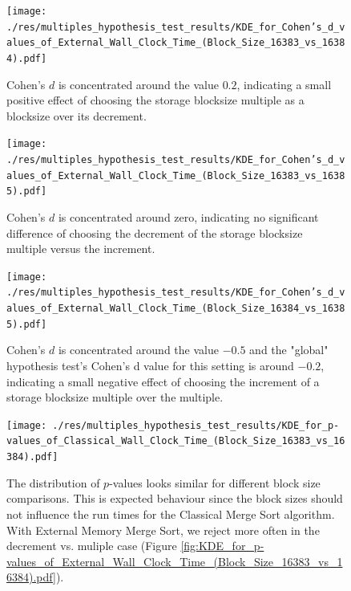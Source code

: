 \documentclass[twocolumn]{article}
\begin{document}
\begin{figure}[htb]
	\begin{minipage}{0.475 \textwidth}
	\centering
	\texttt{[image: ./res/multiples\_hypothesis\_test\_results/KDE\_for\_Cohen's\_d\_values\_of\_External\_Wall\_Clock\_Time\_(Block\_Size\_16383\_vs\_16384).pdf]}
	\caption{Cohen's \(d\) is concentrated around the value \( 0.2 \), indicating a small positive effect of choosing the storage blocksize multiple as a blocksize over its decrement.}
	\label{fig:KDE_for_Cohen's_d_values_of_External_Wall_Clock_Time_(Block_Size_16383_vs_16384).pdf}
	\end{minipage}
\end{figure}

\begin{figure}[htb]
	\begin{minipage}{0.475 \textwidth}
	\centering
	\texttt{[image: ./res/multiples\_hypothesis\_test\_results/KDE\_for\_Cohen's\_d\_values\_of\_External\_Wall\_Clock\_Time\_(Block\_Size\_16383\_vs\_16385).pdf]}
	\caption{Cohen's \(d\) is concentrated around zero, indicating no significant difference of choosing the decrement of the storage blocksize multiple versus the increment.}
	\label{fig:KDE_for_Cohen's_d_values_of_External_Wall_Clock_Time_(Block_Size_16383_vs_16385).pdf}
	\end{minipage}
\end{figure}

\begin{figure}[htb]
	\begin{minipage}{0.475 \textwidth}
	\centering
	\texttt{[image: ./res/multiples\_hypothesis\_test\_results/KDE\_for\_Cohen's\_d\_values\_of\_External\_Wall\_Clock\_Time\_(Block\_Size\_16384\_vs\_16385).pdf]}
	\caption{Cohen's \(d\) is concentrated around the value \( -0.5 \) and the "global" hypothesis test's Cohen's d value for this setting is around \( -0.2 \), 
	indicating a small negative effect of choosing the increment of a storage blocksize multiple over the multiple.}
	\label{fig:KDE_for_Cohen's_d_values_of_External_Wall_Clock_Time_(Block_Size_16384_vs_16385).pdf}
	\end{minipage}
\end{figure}

\begin{figure}[htb]
	\begin{minipage}{0.475 \textwidth}
	\centering
	\texttt{[image: ./res/multiples\_hypothesis\_test\_results/KDE\_for\_p-values\_of\_Classical\_Wall\_Clock\_Time\_(Block\_Size\_16383\_vs\_16384).pdf]}
	\caption{The distribution of \( p \)-values looks similar for different block size comparisons. This is expected behaviour since the block sizes should not influence the run times for the Classical Merge
	Sort algorithm. With External Memory Merge Sort, we reject more often in the decrement vs. muliple case (Figure \ref{fig:KDE_for_p-values_of_External_Wall_Clock_Time_(Block_Size_16383_vs_16384).pdf}).}
	\label{fig:KDE_for_p-values_of_Classical_Wall_Clock_Time_(Block_Size_16383_vs_16384).pdf}
\end{minipage}
\end{figure}
\end{document}
